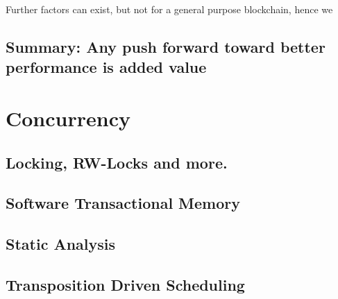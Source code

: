 Further factors can exist, but not for a general purpose blockchain, hence we

\subsection{Summary: Any push forward toward better performance is added value} \label{chap_bg:subsec:summary_speedup}


\section{Concurrency} \label{chap_bg:sec:concurrency}

\subsection{Locking, RW-Locks and more.}
\subsection{Software Transactional Memory}
\subsection{Static Analysis}
\subsection{Transposition Driven Scheduling}

